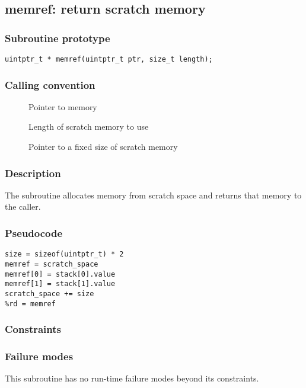 \clearpage
{}
{}
\label{subr:memref}
\subsection*{memref: return scratch memory}

\subsubsection*{Subroutine prototype}

\begin{verbatim}
uintptr_t * memref(uintptr_t ptr, size_t length);
\end{verbatim}

\subsubsection*{Calling convention}

\begin{description}
\item[] Pointer to memory
\item[] Length of scratch memory to use
\item[] Pointer to a fixed size of scratch memory
\end{description}

\subsubsection*{Description}

The  subroutine allocates memory from scratch
space and returns that memory to the caller.
\subsubsection*{Pseudocode}

\begin{verbatim}
size = sizeof(uintptr_t) * 2
memref = scratch_space
memref[0] = stack[0].value
memref[1] = stack[1].value
scratch_space += size
%rd = memref
\end{verbatim}

\subsubsection*{Constraints}

\subsubsection*{Failure modes}

This subroutine has no run-time failure modes beyond its constraints.
